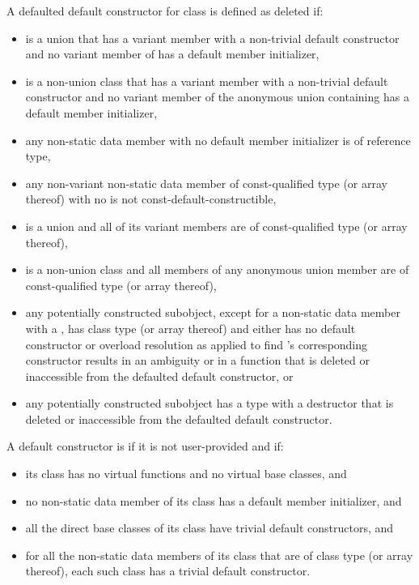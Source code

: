 \pnum
A defaulted default constructor for class  is defined as deleted if:
\begin{itemize}
\item {} is a union that has a variant member
with a non-trivial default constructor and
no variant member of  has a default member initializer,

\item {} is a non-union class that has a variant member 
with a non-trivial default constructor and
no variant member of the anonymous union containing 
has a default member initializer,

\item any non-static data member with no default member initializer is
of reference type,

\item any non-variant non-static data member of const-qualified type (or array
thereof) with no 
is not const-default-constructible,

\item {} is a union and all of its variant members are of const-qualified
type (or array thereof),

\item {} is a non-union class and all members of any anonymous union member are
of const-qualified type (or array thereof),

\item any potentially constructed subobject, except for a non-static data member
with a , has
class type  (or array thereof) and either 
has no default constructor or overload resolution
as applied to find 's corresponding
constructor results in an ambiguity or in a function that is deleted or
inaccessible from the defaulted default constructor, or

\item any potentially constructed subobject has a type
with a destructor that is deleted or inaccessible from the defaulted default
constructor.
\end{itemize}

\pnum
A default constructor is
if it is not user-provided and if:
\begin{itemize}
\item
its class has no virtual functions and no virtual base
classes, and

\item no non-static data member of its class has
a default member initializer, and

\item
all the direct base classes of its class have trivial default constructors, and

\item
for all the non-static data members of its class that are of class
type (or array thereof), each such class has a trivial default constructor.
\end{itemize}

